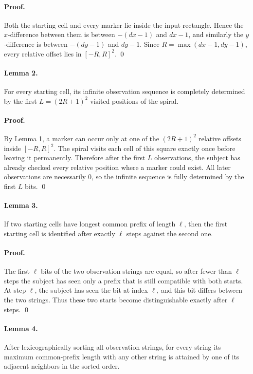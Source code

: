 \documentclass[11pt]{article}
\begin{document}
\paragraph{Proof.}
Both the starting cell and every marker lie inside the input rectangle. Hence the $x$-difference between
them is between $-(dx-1)$ and $dx-1$, and similarly the $y$-difference is between $-(dy-1)$ and
$dy-1$. Since $R = \max(dx-1, dy-1)$, every relative offset lies in $[-R,R]^2$. \qed

\paragraph{Lemma 2.}
For every starting cell, its infinite observation sequence is completely determined by the first
$L=(2R+1)^2$ visited positions of the spiral.

\paragraph{Proof.}
By Lemma 1, a marker can occur only at one of the $(2R+1)^2$ relative offsets inside $[-R,R]^2$.
The spiral visits each cell of this square exactly once before leaving it permanently. Therefore after the
first $L$ observations, the subject has already checked every relative position where a marker could exist.
All later observations are necessarily $0$, so the infinite sequence is fully determined by the first $L$
bits. \qed

\paragraph{Lemma 3.}
If two starting cells have longest common prefix of length $\ell$, then the first starting cell is identified
after exactly $\ell$ steps against the second one.

\paragraph{Proof.}
The first $\ell$ bits of the two observation strings are equal, so after fewer than $\ell$ steps the subject
has seen only a prefix that is still compatible with both starts. At step $\ell$, the subject has seen the
bit at index $\ell$, and this bit differs between the two strings. Thus these two starts become
distinguishable exactly after $\ell$ steps. \qed

\paragraph{Lemma 4.}
After lexicographically sorting all observation strings, for every string its maximum common-prefix length
with any other string is attained by one of its adjacent neighbors in the sorted order.
\end{document}

